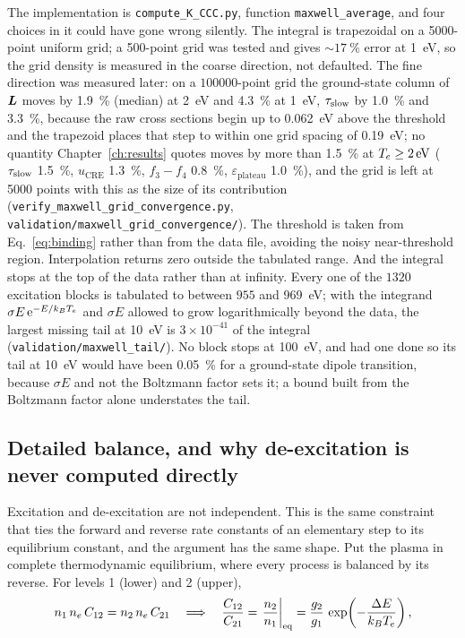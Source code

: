 The implementation is \texttt{compute\_K\_CCC.py}, function
\texttt{maxwell\_average}, and four choices in it could have gone wrong
silently. The integral is trapezoidal on a 5000-point uniform grid; a 500-point
grid was tested and gives $\sim\SI{17}{\percent}$ error at
\SI{1}{\electronvolt}, so the grid density is measured in the coarse
direction, not defaulted. The fine direction was measured later: on a
$100000$-point grid the ground-state column of $\bm{L}$ moves by
\SI{1.9}{\percent} (median) at \SI{2}{\electronvolt} and \SI{4.3}{\percent}
at \SI{1}{\electronvolt}, $\tau_{\mathrm{slow}}$ by \SI{1.0}{\percent} and
\SI{3.3}{\percent}, because the raw cross sections begin up to
\SI{0.062}{\electronvolt} above the threshold and the trapezoid places that
step to within one grid spacing of \SI{0.19}{\electronvolt}; no quantity
Chapter~\ref{ch:results} quotes moves by more than \SI{1.5}{\percent} at
$T_e \ge \SI{2}{\electronvolt}$ ($\tau_{\mathrm{slow}}$ \SI{1.5}{\percent},
$u_{\mathrm{CRE}}$ \SI{1.3}{\percent}, $f_3 - f_4$ \SI{0.8}{\percent},
$\varepsilon_{\mathrm{plateau}}$ \SI{1.0}{\percent}), and the grid is left at
5000 points with this as the size of its contribution
(\texttt{verify\_maxwell\_grid\_convergence.py},
\texttt{validation/maxwell\_grid\_convergence/}). The
threshold is taken from Eq.~\eqref{eq:binding} rather than from the data file,
avoiding the noisy near-threshold region. Interpolation returns zero outside the
tabulated range. And the integral stops at the top of the data rather than at infinity. Every
one of the $1320$ excitation blocks is tabulated to between $955$ and
\SI{969}{\electronvolt}; with the integrand $\sigma E\,\mathrm{e}^{-E/k_BT_e}$
and $\sigma E$ allowed to grow logarithmically beyond the data, the largest
missing tail at \SI{10}{\electronvolt} is $3\times10^{-41}$ of the integral
(\texttt{validation/maxwell\_tail/}). No block stops at
\SI{100}{\electronvolt}, and had one done so its tail at
\SI{10}{\electronvolt} would have been \SI{0.05}{\percent} for a ground-state
dipole transition, because $\sigma E$ and not the Boltzmann factor sets it; a
bound built from the Boltzmann factor alone understates the tail.

\subsection{Detailed balance, and why de-excitation is never computed directly}

Excitation and de-excitation are not independent. This is the same constraint
that ties the forward and reverse rate constants of an elementary step to its
equilibrium constant, and the argument has the same shape. Put the plasma in complete thermodynamic
equilibrium, where every process is balanced by its reverse. For levels 1
(lower) and 2 (upper),
\begin{equation}
  n_1\,n_e\,C_{12} = n_2\,n_e\,C_{21}
  \quad\Longrightarrow\quad
  \frac{C_{12}}{C_{21}} = \left.\frac{n_2}{n_1}\right|_{\mathrm{eq}}
  = \frac{g_2}{g_1}\,\exp\!\left(-\frac{\Delta E}{k_BT_e}\right),
  \label{eq:detailed_balance}
\end{equation}

